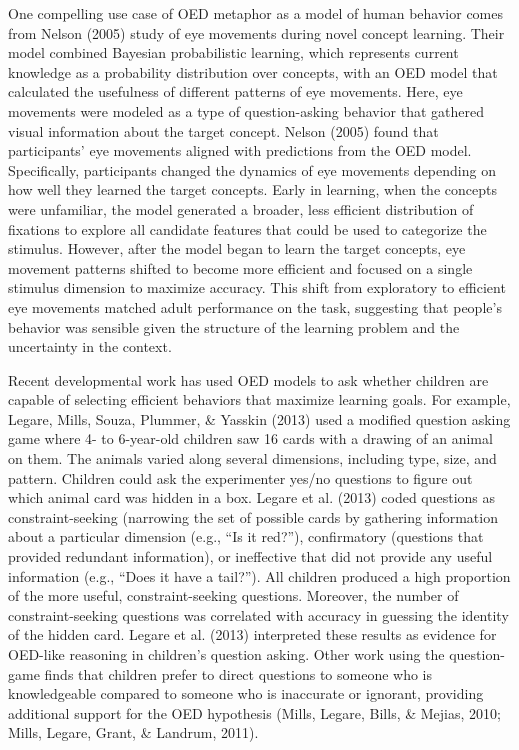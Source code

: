 \documentclass[oneside]{report}
\begin{document}
One compelling use case of OED metaphor as a model of human behavior
comes from Nelson (2005) study of eye movements during novel concept
learning. Their model combined Bayesian probabilistic learning, which
represents current knowledge as a probability distribution over
concepts, with an OED model that calculated the usefulness of different
patterns of eye movements. Here, eye movements were modeled as a type of
question-asking behavior that gathered visual information about the
target concept. Nelson (2005) found that participants' eye movements
aligned with predictions from the OED model. Specifically, participants
changed the dynamics of eye movements depending on how well they learned
the target concepts. Early in learning, when the concepts were
unfamiliar, the model generated a broader, less efficient distribution
of fixations to explore all candidate features that could be used to
categorize the stimulus. However, after the model began to learn the
target concepts, eye movement patterns shifted to become more efficient
and focused on a single stimulus dimension to maximize accuracy. This
shift from exploratory to efficient eye movements matched adult
performance on the task, suggesting that people's behavior was sensible
given the structure of the learning problem and the uncertainty in the
context.

Recent developmental work has used OED models to ask whether children
are capable of selecting efficient behaviors that maximize learning
goals. For example, Legare, Mills, Souza, Plummer, \& Yasskin (2013)
used a modified question asking game where 4- to 6-year-old children saw
16 cards with a drawing of an animal on them. The animals varied along
several dimensions, including type, size, and pattern. Children could
ask the experimenter yes/no questions to figure out which animal card
was hidden in a box. Legare et al. (2013) coded questions as
constraint-seeking (narrowing the set of possible cards by gathering
information about a particular dimension (e.g., ``Is it red?''),
confirmatory (questions that provided redundant information), or
ineffective that did not provide any useful information (e.g., ``Does it
have a tail?''). All children produced a high proportion of the more
useful, constraint-seeking questions. Moreover, the number of
constraint-seeking questions was correlated with accuracy in guessing
the identity of the hidden card. Legare et al. (2013) interpreted these
results as evidence for OED-like reasoning in children's question
asking. Other work using the question-game finds that children prefer to
direct questions to someone who is knowledgeable compared to someone who
is inaccurate or ignorant, providing additional support for the OED
hypothesis (Mills, Legare, Bills, \& Mejias, 2010; Mills, Legare, Grant,
\& Landrum, 2011).
\end{document}
